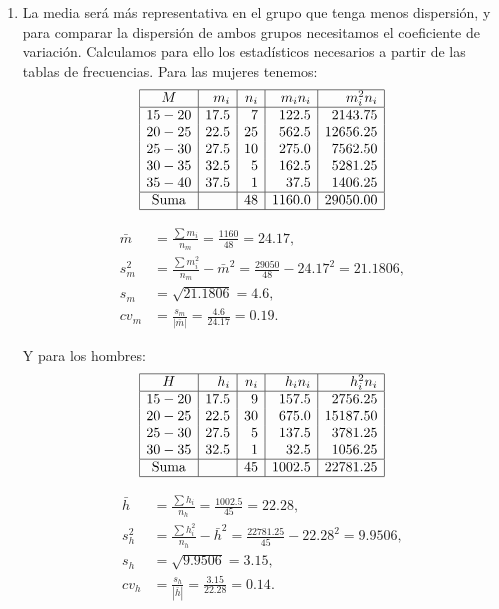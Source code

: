 {\begin{enumerate}
\item La media será más representativa en el grupo que tenga menos dispersión, y para comparar la dispersión de ambos grupos necesitamos el coeficiente de variación.
Calculamos para ello los estadísticos necesarios a partir de las tablas de frecuencias. Para las mujeres tenemos:
\[
\begin{array}{|c|r|r|r|r|}
\hline
   M   & m_i & n_i & m_in_i & m_i^2n_i \\
\hline
 15-20 & 17.5 &  7 & 122.5 & 2143.75 \\
 20-25 & 22.5 & 25 & 562.5 & 12656.25\\
 25-30 & 27.5 & 10 & 275.0 & 7562.50 \\
 30-35 & 32.5 &  5 & 162.5 & 5281.25 \\
 35-40 & 37.5 &  1 &  37.5 & 1406.25 \\
\hline
\mbox{Suma} & & 48 & 1160.0& 29050.00 \\
\hline
\end{array}
\]

\begin{align*}
\bar{m} & = \frac{\sum m_{i}}{n_m}=\frac{1160}{48}=24.17,  \\
s_{m}^2 &= \frac{\sum m_{i}^2}{n_m}-\bar{m}^2 = \frac{29050}{48}-24.17^2=21.1806,  \\
s_m &= \sqrt{21.1806} = 4.6,\\
cv_m &= \frac{s_m}{|\bar{m}|}=\frac{4.6}{24.17} = 0.19.
\end{align*}

Y para los hombres:
\[
\begin{array}{|c|r|r|r|r|}
\hline
   H   & h_i &  n_i & h_in_i &  h_i^2n_i \\
\hline
 15-20 &  17.5 &  9 & 157.5 &  2756.25 \\
 20-25 &  22.5 & 30 & 675.0 & 15187.50 \\
 25-30 &  27.5 &  5 & 137.5 &  3781.25 \\
 30-35 &  32.5 &  1 &  32.5 &  1056.25 \\
\hline
\mbox{Suma} & & 45 & 1002.5 & 22781.25 \\
\hline
\end{array}
\]

\begin{align*}
\bar{h} & = \frac{\sum h_{i}}{n_h}=\frac{1002.5}{45}=22.28,  \\
s_{h}^2 & = \frac{\sum h_{i}^2}{n_h}-\bar{h}^2 =
\frac{22781.25}{45}-22.28^2=9.9506,  \\
s_h &= \sqrt{9.9506} = 3.15,\\
cv_h &= \frac{s_h}{|\bar{h}|}=\frac{3.15}{22.28} = 0.14.
\end{align*}


\end{enumerate}}
